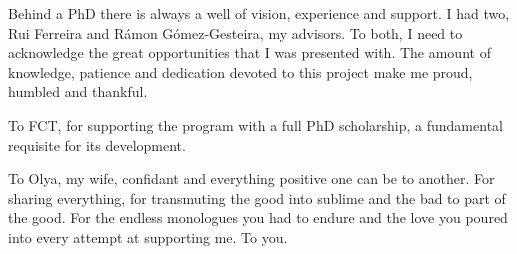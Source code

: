 \begin{acknowledgments}
Behind a PhD there is always a well of vision, experience and support. I had two, Rui Ferreira and R\'{a}mon G\'{o}mez-Gesteira, my advisors. To both, I need to acknowledge the great opportunities that I was presented with. The amount of knowledge, patience and dedication devoted to this project make me proud, humbled and thankful. 

To FCT, for supporting the program with a full PhD scholarship, a fundamental requisite for its development.

To Olya, my wife, confidant and everything positive one can be to another. For sharing everything, for transmuting the good into sublime and the bad to part of the good. For the endless monologues you had to endure and the love you poured into every attempt at supporting me. To you.

\end{acknowledgments}
\clearpage
\thispagestyle{empty}
\cleardoublepage